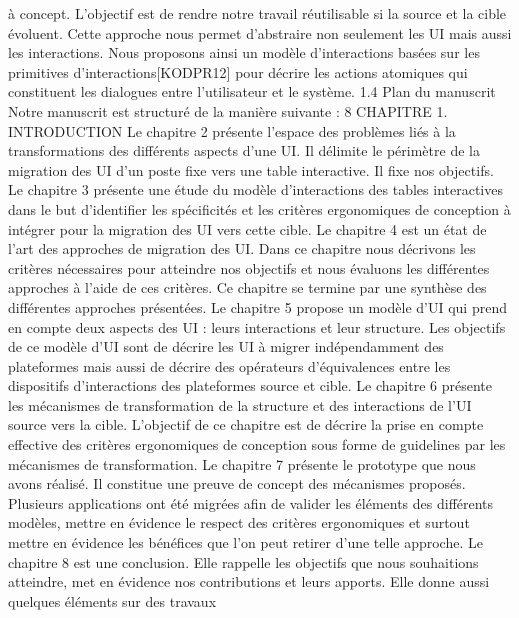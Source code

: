 \documentclass{article}
\begin{document}
\`{a} concept. L’objectif est de rendre notre travail r\'{e}utilisable si la source et la cible \'{e}voluent. Cette
approche nous permet d’abstraire non seulement les UI mais aussi les interactions. Nous proposons
ainsi un mod\`{e}le d’interactions bas\'{e}es sur les primitives d’interactions[KODPR12] pour d\'{e}crire les
actions atomiques qui constituent les dialogues entre l’utilisateur et le syst\`{e}me.
1.4
Plan du manuscrit
Notre manuscrit est structur\'{e} de la mani\`{e}re suivante :
8
CHAPITRE 1. INTRODUCTION
Le chapitre 2 pr\'{e}sente l’espace des probl\`{e}mes li\'{e}s \`{a} la transformations des diff\'{e}rents aspects d’une
UI. Il d\'{e}limite le p\'{e}rim\`{e}tre de la migration des UI d’un poste ﬁxe vers une table interactive. Il ﬁxe nos
objectifs.
Le chapitre 3 pr\'{e}sente une \'{e}tude du mod\`{e}le d’interactions des tables interactives dans le but
d’identiﬁer les sp\'{e}ciﬁcit\'{e}s et les crit\`{e}res ergonomiques de conception \`{a} int\'{e}grer pour la migration
des UI vers cette cible.
Le chapitre 4 est un \'{e}tat de l’art des approches de migration des UI. Dans ce chapitre nous d\'{e}crivons les crit\`{e}res n\'{e}cessaires pour atteindre nos objectifs et nous \'{e}valuons les diff\'{e}rentes approches \`{a}
l’aide de ces crit\`{e}res. Ce chapitre se termine par une synth\`{e}se des diff\'{e}rentes approches pr\'{e}sent\'{e}es.
Le chapitre 5 propose un mod\`{e}le d’UI qui prend en compte deux aspects des UI : leurs interactions
et leur structure. Les objectifs de ce mod\`{e}le d’UI sont de d\'{e}crire les UI \`{a} migrer ind\'{e}pendamment des
plateformes mais aussi de d\'{e}crire des op\'{e}rateurs d’\'{e}quivalences entre les dispositifs d’interactions des
plateformes source et cible.
Le chapitre 6 pr\'{e}sente les m\'{e}canismes de transformation de la structure et des interactions de l’UI
source vers la cible. L’objectif de ce chapitre est de d\'{e}crire la prise en compte effective des crit\`{e}res
ergonomiques de conception sous forme de guidelines par les m\'{e}canismes de transformation.
Le chapitre 7 pr\'{e}sente le prototype que nous avons r\'{e}alis\'{e}. Il constitue une preuve de concept des
m\'{e}canismes propos\'{e}s. Plusieurs applications ont \'{e}t\'{e} migr\'{e}es aﬁn de valider les \'{e}l\'{e}ments des diff\'{e}rents
mod\`{e}les, mettre en \'{e}vidence le respect des crit\`{e}res ergonomiques et surtout mettre en \'{e}vidence les
b\'{e}n\'{e}ﬁces que l’on peut retirer d’une telle approche.
Le chapitre 8 est une conclusion. Elle rappelle les objectifs que nous souhaitions atteindre, met
en \'{e}vidence nos contributions et leurs apports. Elle donne aussi quelques \'{e}l\'{e}ments sur des travaux
\end{document}
